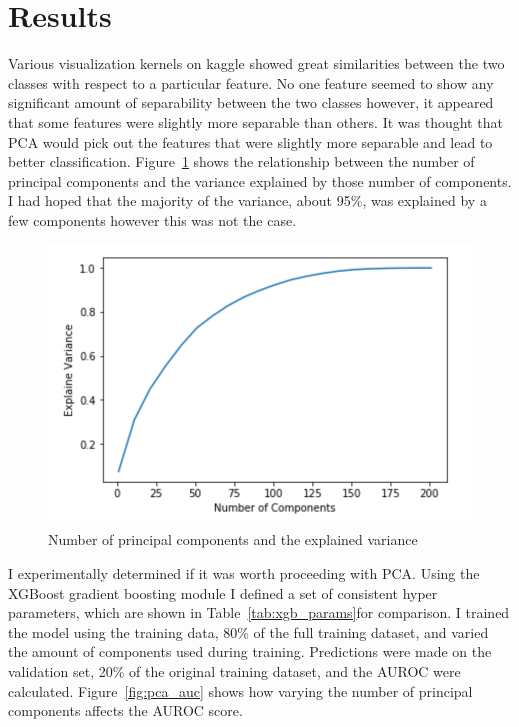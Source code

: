 \documentclass[11pt,letterpaper]{article}
\begin{document}
\fi

\section{Results}

Various visualization kernels on kaggle showed great similarities
between the two classes with respect to a particular feature.  No one feature
seemed to show any significant amount of separability between the two classes
however, it appeared that some features were slightly more separable than others.
It was thought that PCA would pick out the features that were slightly more
separable and lead to better classification.
Figure~\ref{fig:pca_explain} shows the relationship between the number of
principal components and the variance explained by those number of components.
I had hoped that the majority of the variance, about 95\%, was explained by a
few components however this was not the case.

\begin{figure}[h!]
    \centering
        \includegraphics[width=.5\textwidth]{pca_explain.png}
        \caption{Number of principal components and the explained variance}
        \label{fig:pca_explain}
\end{figure}

I experimentally determined if it was worth proceeding with PCA.  Using the
XGBoost gradient boosting module I defined a set of consistent hyper parameters,
which are shown in Table~\ref{tab:xgb_params}for comparison.  I trained the
model using the training data, 80\% of the full training dataset, and varied the
amount of components used during training. Predictions were made on the
validation set, 20\% of the original training dataset, and the AUROC were
calculated.  Figure~\ref{fig:pca_auc} shows how varying the number of principal
components affects the AUROC score. 

\begin{table}[h!]
\centering
\caption{XGBoost parameters}
\label{tab:xgb_params}
\end{table}
\end{document}
